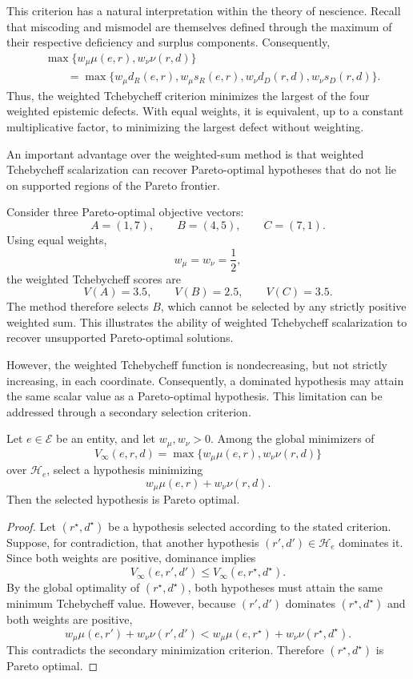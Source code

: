 This criterion has a natural interpretation within the theory of nescience. Recall that miscoding and mismodel are themselves defined through the maximum of their respective deficiency and surplus components. Consequently,
\[
\begin{aligned}
&\max\{w_\mu\mu(e,r),w_\nu\nu(r,d)\} \\
&\qquad = \max\{w_\mu d_R(e,r), w_\mu s_R(e,r), w_\nu d_D(r,d), w_\nu s_D(r,d)\}.
\end{aligned}
\]
Thus, the weighted Tchebycheff criterion minimizes the largest of the four weighted epistemic defects. With equal weights, it is equivalent, up to a constant multiplicative factor, to minimizing the largest defect without weighting.

An important advantage over the weighted-sum method is that weighted Tchebycheff scalarization can recover Pareto-optimal hypotheses that do not lie on supported regions of the Pareto frontier.

\begin{example}
Consider three Pareto-optimal objective vectors:
\[
A=(1,7),\qquad B=(4,5),\qquad C=(7,1).
\]
Using equal weights,
\[
w_\mu=w_\nu=\frac12,
\]
the weighted Tchebycheff scores are
\[
V(A)=3.5,\qquad V(B)=2.5,\qquad V(C)=3.5.
\]
The method therefore selects $B$, which cannot be selected by any strictly positive weighted sum. This illustrates the ability of weighted Tchebycheff scalarization to recover unsupported Pareto-optimal solutions.
\end{example}

However, the weighted Tchebycheff function is nondecreasing, but not strictly increasing, in each coordinate. Consequently, a dominated hypothesis may attain the same scalar value as a Pareto-optimal hypothesis. This limitation can be addressed through a secondary selection criterion.

\begin{proposition}
\label{prop:weighted_tchebycheff_pareto}
Let $e\in\mathcal E$ be an entity, and let $w_\mu,w_\nu>0$. Among the global minimizers of
\[
V_\infty(e,r,d) = \max\{w_\mu\mu(e,r),w_\nu\nu(r,d)\}
\]
over $\mathcal H_e$, select a hypothesis minimizing
\[
w_\mu\mu(e,r)+w_\nu\nu(r,d).
\]
Then the selected hypothesis is Pareto optimal.
\end{proposition}
\begin{proof}
Let $(r^\star,d^\star)$ be a hypothesis selected according to the stated criterion. Suppose, for
contradiction, that another hypothesis $(r',d')\in\mathcal H_e$ dominates it. Since both weights are positive, dominance implies
\[
V_\infty(e,r',d') \leq V_\infty(e,r^\star,d^\star).
\]
By the global optimality of $(r^\star,d^\star)$, both hypotheses must attain the same minimum Tchebycheff value. However, because $(r',d')$ dominates $(r^\star, d^\star)$ and both weights are positive,
\[
w_\mu\mu(e,r')+w_\nu\nu(r',d') < w_\mu\mu(e,r^\star)+w_\nu\nu(r^\star,d^\star).
\]
This contradicts the secondary minimization criterion. Therefore $(r^\star,d^\star)$ is Pareto optimal.
\end{proof}

